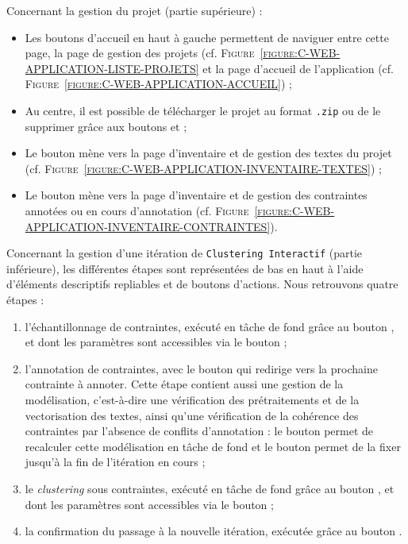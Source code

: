 			Concernant la gestion du projet (partie supérieure) :
			\begin{itemize}
				\item Les boutons d'accueil en haut à gauche permettent de naviguer entre cette page, la page de gestion des projets (cf. \textsc{Figure~\ref{figure:C-WEB-APPLICATION-LISTE-PROJETS}} et la page d'accueil de l'application (cf. \textsc{Figure~\ref{figure:C-WEB-APPLICATION-ACCUEIL}}) ;
				\item Au centre, il est possible de télécharger le projet au format \texttt{.zip} ou de le supprimer grâce aux boutons \textguillemets{\faDownload} et \textguillemets{\faTrash} ;
				\item Le bouton  mène vers la page d'inventaire et de gestion des textes du projet (cf. \textsc{Figure~\ref{figure:C-WEB-APPLICATION-INVENTAIRE-TEXTES}}) ;
				\item Le bouton  mène vers la page d'inventaire et de gestion des contraintes annotées ou en cours d'annotation (cf. \textsc{Figure~\ref{figure:C-WEB-APPLICATION-INVENTAIRE-CONTRAINTES}}).
			\end{itemize}
			
			Concernant la gestion d'une itération de \texttt{Clustering Interactif} (partie inférieure), les différentes étapes sont représentées de bas en haut à l'aide d'éléments descriptifs repliables et de boutons d'actions.
			Nous retrouvons quatre étapes :
			\begin{enumerate}
				\item l'échantillonnage de contraintes, exécuté en tâche de fond grâce au bouton , et dont les paramètres sont accessibles via le bouton \textguillemets{\faCog} ;
				\item l'annotation de contraintes, avec le bouton  qui redirige vers la prochaine contrainte à annoter.
				Cette étape contient aussi une gestion de la modélisation, c'est-à-dire une vérification des prétraitements et de la vectorisation des textes, ainsi qu'une vérification de la cohérence des contraintes par l'absence de conflits d'annotation : le bouton  permet de recalculer cette modélisation en tâche de fond et le bouton  permet de la fixer jusqu'à la fin de l'itération en cours ;
				\item le \textit{clustering} sous contraintes, exécuté en tâche de fond grâce au bouton , et dont les paramètres sont accessibles via le bouton \textguillemets{\faCog} ;
				\item la confirmation du passage à la nouvelle itération, exécutée grâce au bouton .
			\end{enumerate}
			
